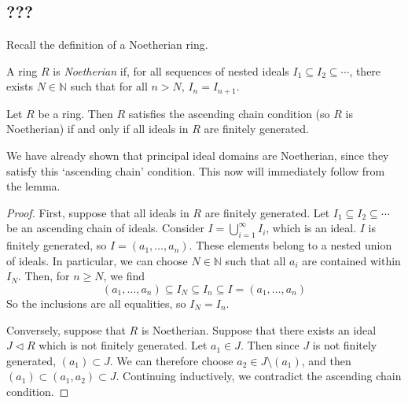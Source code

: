 \subsection{???}
Recall the definition of a Noetherian ring.
\begin{definition}
	A ring \( R \) is \textit{Noetherian} if, for all sequences of nested ideals \( I_1 \subseteq I_2 \subseteq \cdots \), there exists \( N \in \mathbb N \) such that for all \( n > N \), \( I_n = I_{n+1} \).
\end{definition}
\begin{lemma}
	Let \( R \) be a ring.
	Then \( R \) satisfies the ascending chain condition (so \( R \) is Noetherian) if and only if all ideals in \( R \) are finitely generated.
\end{lemma}
We have already shown that principal ideal domains are Noetherian, since they satisfy this `ascending chain' condition.
This now will immediately follow from the lemma.
\begin{proof}
	First, suppose that all ideals in \( R \) are finitely generated.
	Let \( I_1 \subseteq I_2 \subseteq \cdots \) be an ascending chain of ideals.
	Consider \( I = \bigcup_{i=1}^\infty I_i \), which is an ideal.
	\( I \) is finitely generated, so \( I = (a_1, \dots, a_n) \).
	These elements belong to a nested union of ideals.
	In particular, we can choose \( N \in \mathbb N \) such that all \( a_i \) are contained within \( I_N \).
	Then, for \( n \geq N \), we find
	\[ (a_1, \dots, a_n) \subseteq I_N \subseteq I_n \subseteq I = (a_1, \dots, a_n) \]
	So the inclusions are all equalities, so \( I_N = I_n \).

	Conversely, suppose that \( R \) is Noetherian.
	Suppose that there exists an ideal \( J \triangleleft R \) which is not finitely generated.
	Let \( a_1 \in J \).
	Then since \( J \) is not finitely generated, \( (a_1) \subset J \).
	We can therefore choose \( a_2 \in J \setminus (a_1) \), and then \( (a_1) \subset (a_1, a_2) \subset J \).
	Continuing inductively, we contradict the ascending chain condition.
\end{proof}

